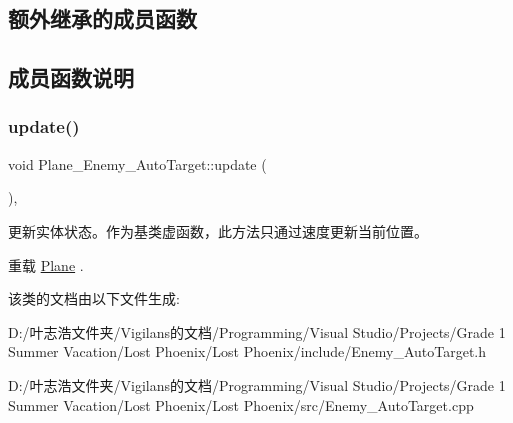 \subsection*{额外继承的成员函数}


\subsection{成员函数说明}
\mbox{\label{class_plane___enemy___auto_target_a79e6eda540d282205ce6151ae0b304ca}} 
\subsubsection{\texorpdfstring{update()}{update()}}
{\footnotesize\ttfamily void Plane\+\_\+\+Enemy\+\_\+\+Auto\+Target\+::update (\begin{DoxyParamCaption}{ }\end{DoxyParamCaption})\hspace{0.3cm}{\ttfamily [override]}, {\ttfamily [virtual]}}



更新实体状态。作为基类虚函数，此方法只通过速度更新当前位置。 



重载 \hyperlink{class_plane_a7fbb07f76503fe057772e01f542afc32}{Plane} .



该类的文档由以下文件生成\+:\begin{DoxyCompactItemize}
\item 
D\+:/叶志浩文件夹/\+Vigilans的文档/\+Programming/\+Visual Studio/\+Projects/\+Grade 1 Summer Vacation/\+Lost Phoenix/\+Lost Phoenix/include/Enemy\+\_\+\+Auto\+Target.\+h\item 
D\+:/叶志浩文件夹/\+Vigilans的文档/\+Programming/\+Visual Studio/\+Projects/\+Grade 1 Summer Vacation/\+Lost Phoenix/\+Lost Phoenix/src/Enemy\+\_\+\+Auto\+Target.\+cpp\end{DoxyCompactItemize}
